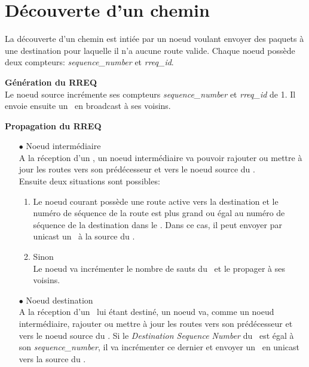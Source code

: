     \section{Découverte d'un chemin}
        La découverte d'un chemin est intiée par un noeud voulant envoyer des paquets à une destination pour laquelle il n'a aucune route valide.
        Chaque noeud possède deux compteurs: \textit{sequence\_number} et \textit{rreq\_id}.
        
        
        \vspace{0.5cm}
        \textbf{Génération du RREQ}\\
            Le noeud source incrémente ses compteurs \textit{sequence\_number} et \textit{rreq\_id} de 1.
            Il envoie ensuite un \rreq\ en broadcast à ses voisins.
        
        
        \vspace{0.5cm}
        \textbf{Propagation du RREQ}\\
            \begin{itemize}
                \item[$\bullet$] Noeud intermédiaire\\
                    A la réception d'un \rreq, un noeud intermédiaire va pouvoir rajouter ou mettre à jour
                    les routes vers son prédécesseur et vers le noeud source du \rreq.\\
                    Ensuite deux situations sont possibles:
                    \begin{enumerate}
                        \item Le noeud courant possède une route active vers la destination et le numéro de séquence de la route est plus grand 
                            ou égal au numéro de séquence de la destination dans le \rreq.
                            Dans ce cas, il peut envoyer par unicast un \rrep\ à la source du \rreq.
                        \item Sinon\\
                            Le noeud va incrémenter le nombre de sauts du \rreq\ et le propager à ses voisins.
                    \end{enumerate}

                \item[$\bullet$] Noeud destination\\
                    A la réception d'un \rreq\  lui étant destiné, un noeud va, comme un noeud intermédiaire, 
                    rajouter ou mettre à jour les routes vers son prédécesseur et vers le noeud source du \rreq.
                    Si le \textit{Destination Sequence Number} du \rreq\ est égal à son \textit{sequence\_number},
                    il va incrémenter ce dernier et envoyer un \rrep\ en unicast vers la source du \rreq.     
            \end{itemize}

